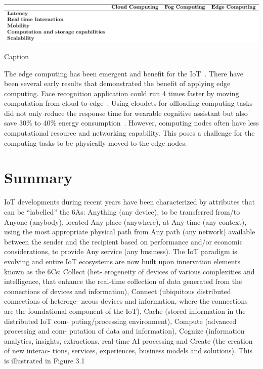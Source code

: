 \begin{table}[ht!]
    \centering
    \includegraphics[scale=.75]{Table/2-3-edge-fog-cloud.pdf}
    \caption{Caption}
    \label{tab:my_label}
\end{table}

The edge computing has been emergent and benefit for the IoT~\citep{Yu:2018}. 
There have been several early results that demonstrated the benefit of applying edge computing. 
Face recognition application could run 4 times faster by moving computation from cloud to edge~\citep{Yi:2015}.
Using cloudets for offloading computing tasks did not only reduce the response time for wearable cognitive assistant but also save 30$\%$ to 40$\%$ energy consumption~\citep{Ha:2014}. 
However, computing nodes often have less computational resource and networking capability. 
This poses a challenge for the computing tasks to be physically moved to the edge nodes.



\section{Summary}

IoT developments during recent years have been characterized by
attributes that can be “labelled” the 6As: Anything (any device), to be
transferred from/to Anyone (anybody), located Any place (anywhere), at
Any time (any context), using the most appropriate physical path from Any
path (any network) available between the sender and the recipient based
on performance and/or economic considerations, to provide Any service
(any business). The IoT paradigm is evolving and entire IoT ecosystems
are now built upon innervation elements known as the 6Cs: Collect (het-
erogeneity of devices of various complexities and intelligence, that enhance
the real-time collection of data generated from the connections of devices
and information), Connect (ubiquitous distributed connections of heteroge-
neous devices and information, where the connections are the foundational
component of the IoT), Cache (stored information in the distributed IoT com-
puting/processing environment), Compute (advanced processing and com-
putation of data and information), Cognize (information analytics, insights,
extractions, real-time AI processing and Create (the creation of new interac-
tions, services, experiences, business models and solutions). This is illustrated
in Figure 3.1






















